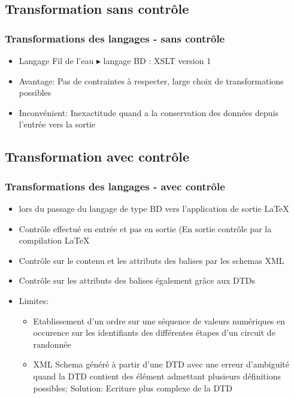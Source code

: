 \documentclass[10pt, compress]{beamer}
\begin{document}
\subsection{Transformation sans contrôle}
\begin{frame}[fragile]
 \frametitle{Transformations des langages - sans contrôle}
 \begin{itemize}[<+->]
  [square]
    \item Langage Fil de l'eau $\blacktriangleright$ langage BD : XSLT version 1
    \item Avantage: Pas de contraintes à respecter, large choix de transformations possibles 
    \item Inconvénient: Inexactitude quand a la conservation des données depuis l'entrée vers la sortie
  \end{itemize}
\end{frame}

\subsection{Transformation avec contrôle}
\begin{frame}[fragile]
 \frametitle{Transformations des langages - avec contrôle}
 \begin{itemize}[<+->]
  [square]
    \item{lors du passage du langage de type BD vers l'application de sortie \LaTeX}
    \item{Contrôle effectué en entrée et pas en sortie (En sortie contrôle par la compilation \LaTeX}
    \item{Contrôle sur le contenu et les attributs des balises par les schemas XML}
    \item{Contrôle sur les attributs des balises également grâce aux DTDs}
    \item Limites: 
      \begin{itemize}
       \item Etablissement d'un ordre sur une séquence de valeurs numériques en occurence sur les identifiants des différentes étapes d'un circuit de randonnée  
       \item XML Schema généré à partir d'une DTD avec une erreur d'ambiguïté quand la DTD contient des élément admettant plusieurs définitions possibles; Solution: Ecriture plus complexe de la DTD
      \end{itemize}
  \end{itemize}
\end{frame}
\end{document}
